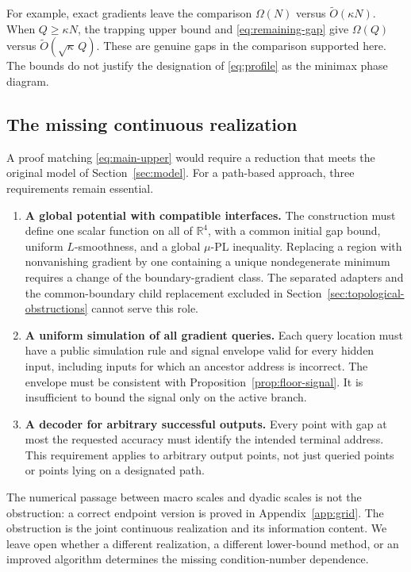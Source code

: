 \documentclass[11pt,a4paper]{article}
\newcommand{\R}{\mathbb R}
\newcommand{\tO}{\widetilde O}
\theoremstyle{definition}
\theoremstyle{remark}
\begin{document}
For example, exact gradients leave the comparison
$\Omega(N)$ versus $\tO(\kappa N)$.
When $Q\ge\kappa N$, the trapping upper bound and
\eqref{eq:remaining-gap} give
$\Omega(Q)$ versus $\tO(\sqrt\kappa\,Q)$.
These are genuine gaps in the comparison supported here.
The bounds do not justify the designation of
\eqref{eq:profile} as the minimax phase diagram.

\subsection{The missing continuous realization}

A proof matching \eqref{eq:main-upper} would require a reduction
that meets the original model of Section~\ref{sec:model}.
For a path-based approach, three requirements remain essential.

\begin{enumerate}
\item \textbf{A global potential with compatible interfaces.}
The construction must define one scalar function on all of
$\R^4$, with a common initial gap bound, uniform $L$-smoothness,
and a global $\mu$-PL inequality.  Replacing a region with
nonvanishing gradient by one containing a unique nondegenerate
minimum requires a change of the boundary-gradient class.
The separated adapters and the
common-boundary child replacement excluded in
Section~\ref{sec:topological-obstructions} cannot serve this role.

\item \textbf{A uniform simulation of all gradient queries.}
Each query location must have a public simulation rule and
signal envelope valid for every hidden input, including inputs
for which an ancestor address is incorrect.
The envelope must be consistent with
Proposition~\ref{prop:floor-signal}.  It is insufficient to
bound the signal only on the active branch.

\item \textbf{A decoder for arbitrary successful outputs.}
Every point with gap at most the requested accuracy must identify
the intended terminal address.  This requirement applies to
arbitrary output points, not just queried points or points lying
on a designated path.
\end{enumerate}

The numerical passage between macro scales and dyadic scales is
not the obstruction: a correct endpoint version is proved in
Appendix~\ref{app:grid}.  The obstruction is the joint
continuous realization and its information content.  We leave
open whether a different realization, a different lower-bound
method, or an improved algorithm determines the missing
condition-number dependence.
\end{document}
